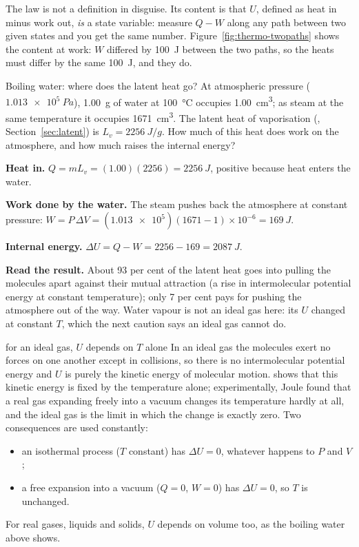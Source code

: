 The law is not a definition in disguise. Its content is that $U$, defined as heat in minus work out,
\emph{is} a state variable: measure $Q-W$ along any path between two given states and you get the same
number. Figure~\ref{fig:thermo-twopaths} shows the content at work: $W$ differed by \SI{100}{J} between the
two paths, so the heats must differ by the same \SI{100}{J}, and they do.

\begin{exbox}{Boiling water: where does the latent heat go?}\label{ex:thermo-boiling}
At atmospheric pressure ($\SI{1.013e5}{Pa}$), \SI{1.00}{g} of water at \SI{100}{\celsius} occupies
\SI{1.00}{cm^3}; as steam at the same temperature it occupies \SI{1671}{cm^3}. The latent heat of
vaporisation (, Section~\ref{sec:latent}) is $L_v=\SI{2256}{J/g}$. How much of this heat does work on the
atmosphere, and how much raises the internal energy?

 \textbf{Heat in.} $Q=mL_v=(1.00)(2256)=\SI{2256}{J}$, positive because heat enters the water.

 \textbf{Work done by the water.} The steam pushes back the atmosphere at constant pressure:
$W=P\,\Delta V=(\num{1.013e5})(1671-1)\times10^{-6}=\SI{169}{J}$.

 \textbf{Internal energy.} $\Delta U=Q-W=2256-169=\SI{2087}{J}$.

 \textbf{Read the result.} About 93 per cent of the latent heat goes into pulling the molecules
apart against their mutual attraction (a rise in intermolecular potential energy at constant temperature);
only 7 per cent pays for pushing the atmosphere out of the way. Water vapour is not an ideal gas here: its
$U$ changed at constant $T$, which the next caution says an ideal gas cannot do.
\end{exbox}

\begin{trapbox}{for an ideal gas, $U$ depends on $T$ alone}
In an ideal gas the molecules exert no forces on one another except in collisions, so there is no
intermolecular potential energy and $U$ is purely the kinetic energy of molecular motion.
 shows that this kinetic energy is fixed by the temperature alone; experimentally,
Joule found that a real gas expanding freely into a vacuum changes its temperature hardly at all, and the
ideal gas is the limit in which the change is exactly zero. Two consequences are used constantly:
\begin{itemize}
\item an isothermal process ($T$ constant) has $\Delta U=0$, whatever happens to $P$ and $V$;
\item a free expansion into a vacuum ($Q=0$, $W=0$) has $\Delta U=0$, so $T$ is unchanged.
\end{itemize}
For real gases, liquids and solids, $U$ depends on volume too, as the boiling water above shows.
\end{trapbox}

